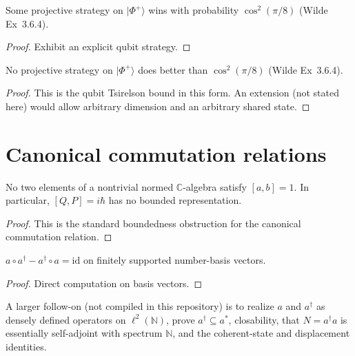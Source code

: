 \begin{theorem}
  \label{thm:chsh_achieves}
  Some projective strategy on $\lvert\Phi^+\rangle$ wins with probability
  $\cos^2(\pi/8)$ (Wilde Ex~3.6.4).
\end{theorem}

\begin{proof}
  Exhibit an explicit qubit strategy.
\end{proof}

\begin{theorem}
  \label{thm:chsh_tsirelson}
  No projective strategy on $\lvert\Phi^+\rangle$ does better than
  $\cos^2(\pi/8)$ (Wilde Ex~3.6.4).
\end{theorem}

\begin{proof}
  This is the qubit Tsirelson bound in this form. An extension (not stated
  here) would allow arbitrary dimension and an arbitrary shared state.
\end{proof}

\chapter{Canonical commutation relations}

\begin{theorem}
  \label{thm:wielandt}
  No two elements of a nontrivial normed $\mathbb{C}$-algebra satisfy
  $[a,b]=1$. In particular, $[Q,P]=i\hbar$ has no bounded representation.
\end{theorem}

\begin{proof}
  This is the standard boundedness obstruction for the canonical commutation
  relation.
\end{proof}

\begin{theorem}
  \label{thm:ccr_on_finite_span}
  $a\circ a^\dagger - a^\dagger\circ a = \mathrm{id}$ on finitely supported
  number-basis vectors.
\end{theorem}

\begin{proof}
  Direct computation on basis vectors.
\end{proof}

A larger follow-on (not compiled in this repository) is to realize $a$ and
$a^\dagger$ as densely defined operators on $\ell^2(\mathbb{N})$, prove
$a^\dagger\subseteq a^\ast$, closability, that $N=a^\dagger a$ is essentially
self-adjoint with spectrum $\mathbb{N}$, and the coherent-state and
displacement identities.

